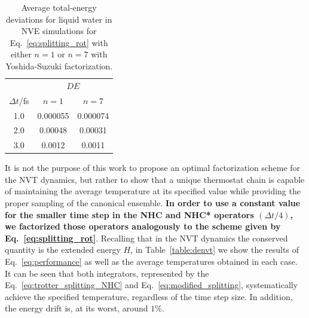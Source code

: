 \documentclass[aip,jcp,reprint,amsmath,amssymb]{revtex4-1}
\begin{document}
\begin{table}
	\caption{Average total-energy deviations for liquid water in NVE simulations for Eq.~\ref{eq:splitting_rot} with either $n = 1$ or $n = 7$ with Yoshida-Suzuki factorization.}
	\label{table:nve}
	\begin{ruledtabular}
		\begin{tabular}{ccc}
			 & \multicolumn{2}{c}{ $D\!E$ } \\
			 \cline{2-3}
			 $\Delta t$/fs & $n = 1$ & $n = 7$ \\
			 \hline
			 1.0 & 0.000055 & 0.000074 \\
			 2.0 & 0.00048  & 0.00031  \\
			 3.0 & 0.0012   & 0.0011   \\
		\end{tabular}
	\end{ruledtabular}
\end{table}

It is not the purpose of this work to propose an optimal factorization scheme for the NVT dynamics, but rather to show that a unique thermostat chain is capable of maintaining the average temperature at its specified value while providing the proper sampling of the canonical ensemble. \textbf{In order to use a constant value for the smaller time step in the NHC and NHC* operators $(\Delta t/4)$, we factorized those operators analogously to the scheme given by Eq.~\ref{eq:splitting_rot}}. Recalling that in the NVT dynamics the conserved quantity is the extended energy $H$, in Table~\ref{table:denvt} we show the results of Eq.~\ref{eq:performance} as well as the average temperatures obtained in each case. It can be seen that both integrators, represented by the Eq.~\ref{eq:trotter_splitting_NHC} and Eq.~\ref{eq:modified_splitting}, systematically achieve the specified temperature, regardless of the time step size. In addition, the energy drift is, at its worst, around $1 \%$.
\end{document}
